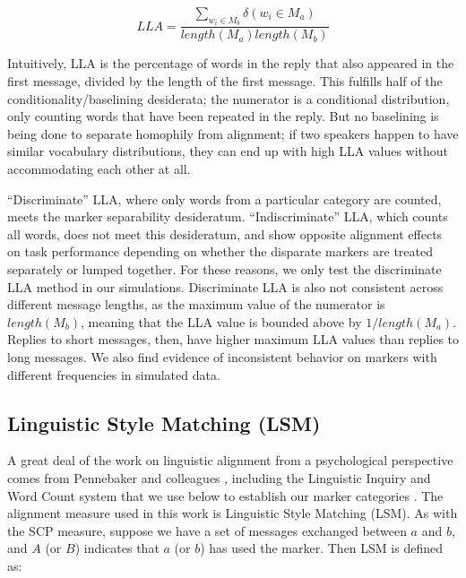 \documentclass{acm_proc_article-sp}
\begin{document}
\begin{equation}
LLA = \frac{\sum_{w_i \in M_b} \delta(w_i \in M_a)}{length(M_a)length(M_b)}
\end{equation}

Intuitively, LLA is the percentage of words in the reply that also appeared in the first message, divided by the length of the first message.  This fulfills half of the conditionality/baselining desiderata; the numerator is a conditional distribution, only counting words that have been repeated in the reply.  But no baselining is being done to separate homophily from alignment; if two speakers happen to have similar vocabulary distributions, they can end up with high LLA values without accommodating each other at all.


``Discriminate'' LLA, where only words from a particular category are counted, meets the marker separability desideratum.  ``Indiscriminate'' LLA, which counts all words, does not meet this desideratum, and \cite{FusaroliEtAl2012} show opposite alignment effects on task performance depending on whether the disparate markers are treated separately or lumped together.  For these reasons, we only test the discriminate LLA method in our simulations. Discriminate LLA is also not consistent across different message lengths, as the maximum value of the numerator is $length(M_b)$, meaning that the LLA value is bounded above by $1/length(M_a)$. Replies to short messages, then, have higher maximum LLA values than replies to long messages.  We also find evidence of inconsistent behavior on markers with different frequencies in simulated data.



\subsection{Linguistic Style Matching (LSM)} 

A great deal of the work on linguistic alignment from a psychological perspective comes from Pennebaker and colleagues \cite{NiederhofferPennebaker2002,GonzalesHancockPennebaker2010,IrelandEtAl2011}, including the Linguistic Inquiry and Word Count system that we use below to establish our marker categories \cite{LIWC}.  The alignment measure used in this work is Linguistic Style Matching (LSM). As with the SCP measure, suppose we have a set of messages exchanged between $a$ and $b$, and $A$ (or $B$) indicates that $a$ (or $b$) has used the marker. Then LSM is defined as:
\end{document}
